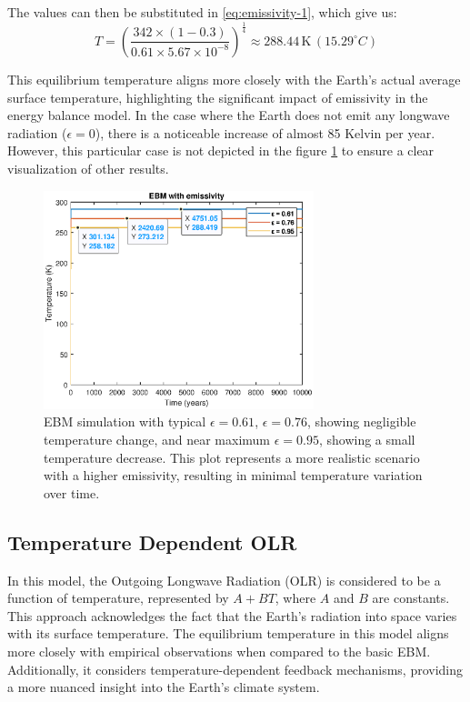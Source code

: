 \documentclass[12pt]{article}
\begin{document}
\noindent The values can then be substituted in \ref{eq:emissivity-1}, which give us:
\begin{equation}
    T = \left( \frac{342 \times (1 - 0.3)}{0.61 \times 5.67 \times 10^{-8}} \right)^{\frac{1}{4}} \approx 288.44 \, \text{K} \, ({15.29}^\circ C)
\end{equation}

This equilibrium temperature aligns more closely with the Earth's actual average surface temperature, highlighting the significant impact of emissivity in the energy balance model. In the case where the Earth does not emit any longwave radiation ($\epsilon=0$), there is a noticeable increase of almost 85 Kelvin per year. However, this particular case is not depicted in the figure \ref{fig:ebm_emissivity} to ensure a clear visualization of other results.

\begin{figure}[H]
    \centering
    \includegraphics[width=0.7\textwidth]{images/ebm_emissivity_diff.eps}
    \caption{EBM simulation with typical $\epsilon=0.61$, $\epsilon=0.76$, showing negligible temperature change, and near maximum $\epsilon=0.95$, showing a small temperature decrease. This plot represents a more realistic scenario with a higher emissivity, resulting in minimal temperature variation over time.}
    \label{fig:ebm_emissivity}
\end{figure}

\subsection{Temperature Dependent OLR} \label{section:olr-temperature}
In this model, the Outgoing Longwave Radiation (OLR) is considered to be a function of temperature, represented by \( A + BT \), where \( A \) and \( B \) are constants. This approach acknowledges the fact that the Earth's radiation into space varies with its surface temperature\cite{kaper-2013-math-ac-budyko}. The equilibrium temperature in this model aligns more closely with empirical observations when compared to the basic EBM. Additionally, it considers temperature-dependent feedback mechanisms, providing a more nuanced insight into the Earth's climate system.
\end{document}
